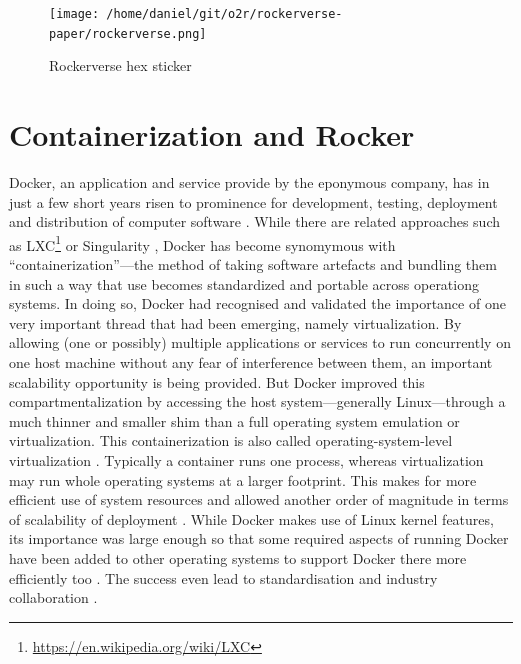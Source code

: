 \begin{figure}
\centering
\texttt{[image: /home/daniel/git/o2r/rockerverse-paper/rockerverse.png]}
\caption{Rockerverse hex sticker}
\end{figure}

\hypertarget{containerization-and-rocker}{%
\section{Containerization and
Rocker}\label{containerization-and-rocker}}

\label{containerisation} \label{rocker}

Docker, an application and service provide by the eponymous company, has
in just a few short years risen to prominence for development, testing,
deployment and distribution of computer software
\citep[cf.][]{datadog_8_2018,munoz_history_2019}. While there are
related approaches such as
LXC\footnote{\href{https://en.wikipedia.org/wiki/LXC}{https://en.wikipedia.org/wiki/LXC}}
or Singularity \citep{kurtzer_singularity_2017}, Docker has become
synomymous with ``containerization''---the method of taking software
artefacts and bundling them in such a way that use becomes standardized
and portable across operationg systems. In doing so, Docker had
recognised and validated the importance of one very important thread
that had been emerging, namely virtualization. By allowing (one or
possibly) multiple applications or services to run concurrently on one
host machine without any fear of interference between them, an important
scalability opportunity is being provided. But Docker improved this
compartmentalization by accessing the host system---generally
Linux---through a much thinner and smaller shim than a full operating
system emulation or virtualization. This containerization is also called
operating-system-level virtualization
\citep{wikipedia_contributors_os-level_2020}. Typically a container runs
one process, whereas virtualization may run whole operating systems at a
larger footprint. This makes for more efficient use of system resources
\citep{felter_updated_2015} and allowed another order of magnitude in
terms of scalability of deployment \citep[cf.][]{datadog_8_2018}. While
Docker makes use of Linux kernel features, its importance was large
enough so that some required aspects of running Docker have been added
to other operating systems to support Docker there more efficiently too
\citep{microsoft_linux_2019}. The success even lead to standardisation
and industry collaboration \citep{oci_open_2019}.

